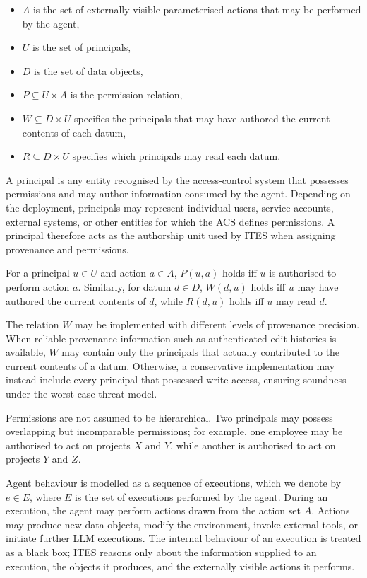 \documentclass{article} %
\begin{document}
\begin{itemize}
    \item \(A\) is the set of externally visible parameterised actions that may be performed by the agent,
    \item \(U\) is the set of principals,
    \item \(D\) is the set of data objects,
    \item \(P \subseteq U \times A\) is the permission relation,
    \item \(W \subseteq D \times U\) specifies the principals that may have authored the current contents of each datum,
    \item \(R \subseteq D \times U\) specifies which principals may read each datum.
\end{itemize}

A principal is any entity recognised by the access-control system that possesses permissions and may author information consumed by the agent. Depending on the deployment, principals may represent individual users, service accounts, external systems, or other entities for which the ACS defines permissions. A principal therefore acts as the authorship unit used by ITES when assigning provenance and permissions.

For a principal \(u \in U\) and action \(a \in A\),
\(P(u,a)\) holds iff \(u\) is authorised to perform action \(a\).
Similarly, for datum \(d \in D\), \(W(d,u)\) holds iff \(u\) may have authored the current contents of \(d\), while \(R(d,u)\) holds iff \(u\) may read \(d\).

The relation \(W\) may be implemented with different levels of provenance precision. When reliable provenance information such as authenticated edit histories is available, \(W\) may contain only the principals that actually contributed to the current contents of a datum. Otherwise, a conservative implementation may instead include every principal that possessed write access, ensuring soundness under the worst-case threat model.

Permissions are not assumed to be hierarchical. Two principals may possess overlapping but incomparable permissions; for example, one employee may be authorised to act on projects \(X\) and \(Y\), while another is authorised to act on projects \(Y\) and \(Z\).

Agent behaviour is modelled as a sequence of executions, which we denote by
\(e \in E\),
where \(E\) is the set of executions performed by the agent. During an execution, the agent may perform actions drawn from the action set \(A\). Actions may produce new data objects, modify the environment, invoke external tools, or initiate further LLM executions. The internal behaviour of an execution is treated as a black box; ITES reasons only about the information supplied to an execution, the objects it produces, and the externally visible actions it performs.
\end{document}
